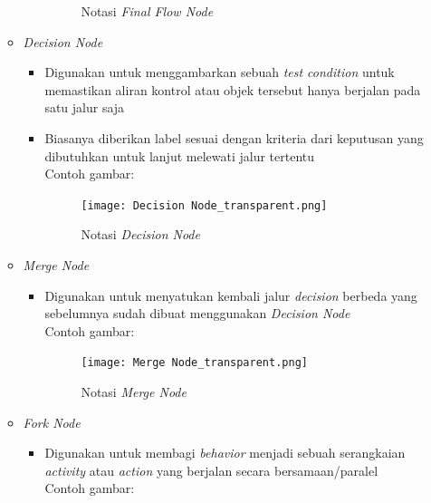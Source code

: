 \documentclass[a4paper]{article}
\begin{document}
\begin{enumerate}
\begin{itemize}
\begin{itemize}
\begin{figure}[h]
                    \caption{Notasi \textit{Final Flow Node}}
                  \end{figure}
        \end{itemize}
        \item \textit{Decision Node}
        \begin{itemize}
            \item Digunakan untuk menggambarkan sebuah \textit{test condition} untuk memastikan aliran kontrol atau objek tersebut hanya berjalan pada satu jalur saja
            \item Biasanya diberikan label sesuai dengan kriteria dari keputusan yang dibutuhkan untuk lanjut melewati jalur tertentu\autocite{systemanalysisdesign-activity-diagram}\\
                  Contoh gambar:\\
                  \begin{figure}[h]
                    \centering
                    \texttt{[image: Decision Node\_transparent.png]}
                    \caption{Notasi \textit{Decision Node}}
                  \end{figure}
        \end{itemize}
        \newpage
        \item \textit{Merge Node}
        \begin{itemize}
            \item Digunakan untuk menyatukan kembali jalur \textit{decision} berbeda yang sebelumnya sudah dibuat menggunakan \textit{Decision Node}\autocite{systemanalysisdesign-activity-diagram}\\
                  Contoh gambar:\\
                  \begin{figure}[h]
                    \centering
                    \texttt{[image: Merge Node\_transparent.png]}
                    \caption{Notasi \textit{Merge Node}}
                  \end{figure}
        \end{itemize}
        \item \textit{Fork Node}
        \begin{itemize}
            \item Digunakan untuk membagi \textit{behavior} menjadi sebuah serangkaian \textit{activity} atau \textit{action} yang berjalan secara bersamaan/paralel\autocite{systemanalysisdesign-activity-diagram}\\
                  Contoh gambar:\\

\end{itemize}
\end{itemize}
\end{enumerate}
\end{document}

